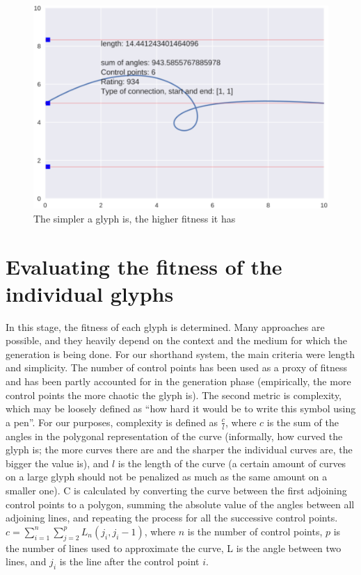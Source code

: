 \documentclass[conference]{IEEEtran}
\begin{document}
\begin{figure}[tbp]
\centering
        \includegraphics[width=0.75\hsize]{e2.pdf}
\caption{The simpler a glyph is, the higher fitness it has}
\end{figure}

\balance

\section{Evaluating the fitness of the individual glyphs}
In this stage, the fitness of each glyph is determined. Many approaches are possible, and they heavily depend on the context and the medium for which the generation is being done. For our shorthand system, the main criteria were length and simplicity. The number of control points has been used as a proxy of fitness and has been partly accounted for in the generation phase (empirically, the more control points the more chaotic the glyph is). The second metric is complexity, which may be loosely
defined as “how hard it would be to write this symbol using a pen”. For our purposes, complexity is defined as \(\frac{c}{l}\), where \(c\) is the sum of the angles in the polygonal representation of the curve (informally, how curved the glyph is; the more curves there are and the sharper the individual curves are, the bigger the value is), and \(l\) is the length of the curve (a certain amount of curves on a large glyph should not be penalized as much as the same amount on a smaller one). C is calculated by converting the curve between the first adjoining control points to a polygon, summing the absolute value of the angles between all adjoining lines, and repeating the process for all the successive control points.
\(c=\sum_{i=1}^n\sum_{j=2}^{p}L_n(j_i, j_i-1)\), where \(n\) is the number of control points,  \(p\) is the number of lines used to approximate the curve, L is the angle between two lines,  and \(j_i\) is the line after the control point \(i\). 
\end{document}
